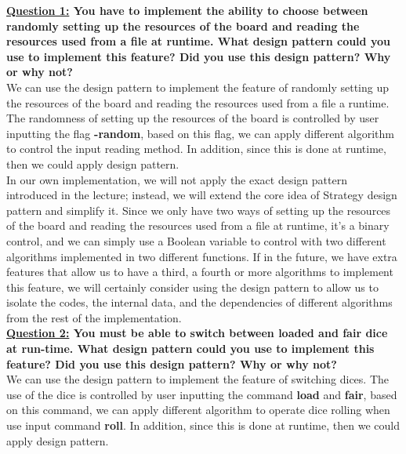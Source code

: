 \documentclass[11pt]{article}
\begin{document}
\pagebreak
\textbf{\underline{Question 1:} You have to implement the ability to choose between randomly setting up the resources of the board and reading the resources used from a file at runtime. What design pattern could you use to implement this feature? Did you use this design pattern? Why or why not?}\\

We can use the \Strategy design pattern to implement the feature of randomly setting up the resources of the board and reading the resources used from a file a runtime. The randomness of setting up the resources of the board is controlled by user inputting the flag \textbf{-random}, based on this flag, we can apply different algorithm to control the input reading method. In addition, since this is done at runtime, then we could apply \Strategy design pattern.\\

In our own implementation, we will not apply the exact \Strategy design pattern introduced in the lecture; instead, we will extend the core idea of Strategy design pattern and simplify it. Since we only have two ways of setting up the resources of the board and reading the resources used from a file at runtime, it's a binary control, and we can simply use a Boolean variable to control with two different algorithms implemented in two different functions. If in the future, we have extra features that allow us to have a third, a fourth or more algorithms to implement this feature, we will certainly consider using the \Strategy design pattern to allow us to isolate the codes, the internal data, and the dependencies of different algorithms from the rest of the implementation.\\

\textbf{\underline{Question 2:} You must be able to switch between loaded and fair dice at run-time. What design pattern could you use to implement this feature? Did you use this design pattern? Why or why not?}\\

We can use the \Strategy design pattern to implement the feature of switching dices. The use of the dice is controlled by user inputting the command \textbf{load} and \textbf{fair}, based on this command, we can apply different algorithm to operate dice rolling when use input command \textbf{roll}. In addition, since this is done at runtime, then we could apply \Strategy design pattern.
\end{document}
